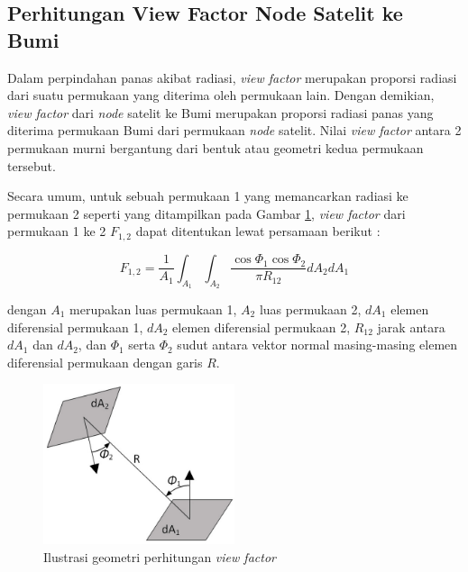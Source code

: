 \subsection{Perhitungan View Factor Node Satelit ke Bumi}

Dalam perpindahan panas akibat radiasi, \textit{view factor} merupakan proporsi
radiasi dari suatu permukaan yang diterima oleh permukaan lain. Dengan
demikian, \textit{view factor} dari \textit{node} satelit ke Bumi merupakan
proporsi radiasi panas yang diterima permukaan Bumi dari permukaan
\textit{node} satelit. Nilai \textit{view factor} antara 2 permukaan murni
bergantung dari bentuk atau geometri kedua permukaan tersebut.

Secara umum, untuk sebuah permukaan 1 yang memancarkan radiasi ke permukaan 2 seperti yang
ditampilkan pada Gambar \ref{fig:viewfactor}, \textit{view factor} dari
permukaan 1 ke 2 $F_{1,2}$ dapat ditentukan lewat persamaan berikut
\cite{muneer2020}:

\begin{equation}
\label{eq:viewfactor}
	F_{1,2} = \frac{1}{A_1} \int_{A_1} \int_{A_2} \frac{\cos{\Phi_1} \cos{\Phi_2}}{\pi R_{12}} dA_2 dA_1
\end{equation}

dengan $A_1$ merupakan luas permukaan 1, $A_2$ luas permukaan 2, $dA_1$ elemen
diferensial permukaan 1, $dA_2$ elemen diferensial permukaan 2, $R_{12}$ jarak
antara $dA_1$ dan $dA_2$, dan $\Phi_1$ serta $\Phi_2$ sudut antara vektor
normal masing-masing elemen diferensial permukaan dengan garis $R$.  

\begin{figure}[!ht]
\setlength{}
\begin{center}
\includegraphics[width=0.5\textwidth]{fig/viewfactor.jpg}
	\caption[Ilustrasi geometri perhitungan \textit{view factor}]{Ilustrasi geometri perhitungan \textit{view factor}~\cite{muneer2020}}
\label{fig:viewfactor}
\end{center}
\end{figure}

